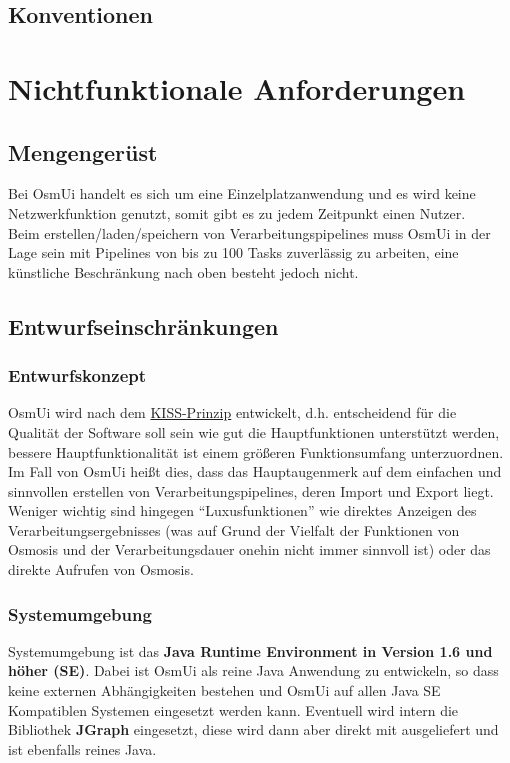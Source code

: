 \documentclass[a4paper,10pt]{scrartcl}
\begin{document}
\subsection{Konventionen}

\section{Nichtfunktionale Anforderungen}
\subsection{Mengengerüst}
Bei OsmUi handelt es sich um eine Einzelplatzanwendung und es wird keine Netzwerkfunktion genutzt, somit gibt es zu jedem Zeitpunkt einen Nutzer.\\
Beim erstellen/laden/speichern von Verarbeitungspipelines muss OsmUi in der Lage sein mit Pipelines von bis zu 100 Tasks zuverlässig zu arbeiten,
eine künstliche Beschränkung nach oben besteht jedoch nicht.
\subsection{Entwurfseinschränkungen}
\subsubsection{Entwurfskonzept}
OsmUi wird nach dem \href{http://de.wikipedia.org/wiki/KISS-Prinzip}{KISS-Prinzip} entwickelt, d.h. entscheidend für die Qualität der Software soll
sein wie gut die Hauptfunktionen unterstützt werden, bessere Hauptfunktionalität ist einem größeren Funktionsumfang unterzuordnen.\\
Im Fall von OsmUi heißt dies, dass das Hauptaugenmerk auf dem einfachen und sinnvollen erstellen von Verarbeitungspipelines, deren Import und Export liegt.
Weniger wichtig sind hingegen ``Luxusfunktionen'' wie direktes Anzeigen des Verarbeitungsergebnisses (was auf Grund der Vielfalt der Funktionen von Osmosis
und der Verarbeitungsdauer onehin nicht immer sinnvoll ist) oder das direkte Aufrufen von Osmosis.
\subsubsection{Systemumgebung}
Systemumgebung ist das \textbf{Java Runtime Environment in Version 1.6 und höher (SE)}. Dabei ist OsmUi als reine Java Anwendung zu entwickeln, so dass
keine externen Abhängigkeiten bestehen und OsmUi auf allen Java SE Kompatiblen Systemen eingesetzt werden kann.
Eventuell wird intern die Bibliothek \textbf{JGraph} eingesetzt, diese wird dann aber direkt mit ausgeliefert
und ist ebenfalls reines Java. 
\end{document}
